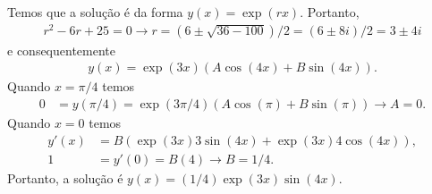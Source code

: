 \documentclass[a4paper,12pt, leqno, answers]{exam}
\begin{document}
\begin{questions}
\begin{parts}
\begin{solution}


            Temos que a solu\c{c}\~{a}o \'{e} da forma $y(x) = \exp(r x)$. Portanto,
            \begin{align*}
                r^2 - 6 r + 25 = 0 \to r = \left( 6 \pm \sqrt{36 - 100} \right) / 2 = \left( 6 \pm 8 i \right) / 2 = 3 \pm 4 i
            \end{align*}
            e consequentemente
            \begin{align*}
                y(x) = \exp(3 x) \left( A \cos(4x) + B \sin(4x) \right).
            \end{align*}
            Quando $x = \pi/4$ temos
            \begin{align*}
                0 &= y(\pi/4) = \exp(3 \pi / 4) \left( A \cos(\pi) + B \sin(\pi) \right) \to A = 0.
            \end{align*}
            Quando $x = 0$ temos
            \begin{align*}
                y'(x) &= B \left( \exp(3 x) 3 \sin(4 x) + \exp(3 x) 4 \cos(4 x) \right), \\
                1 &= y'(0) = B(4) \to B = 1/4.
            \end{align*}
            Portanto, a solu\c{c}\~{a}o \'{e} $y(x) = \left( 1/4 \right) \exp(3 x) \sin(4x)$. 
        \end{solution}


\end{parts}
\end{questions}
\end{document}
